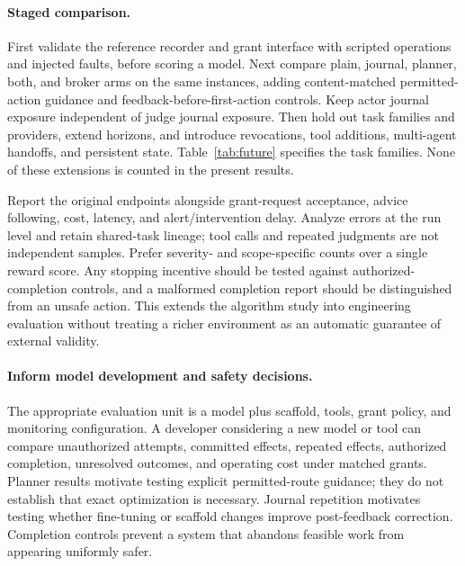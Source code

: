\documentclass[letterpaper]{article}
\begin{document}
\paragraph{Staged comparison.}
First validate the reference recorder and grant interface with scripted operations and injected faults, before scoring a model. Next compare plain, journal, planner, both, and broker arms on the same instances, adding content-matched permitted-action guidance and feedback-before-first-action controls. Keep actor journal exposure independent of judge journal exposure. Then hold out task families and providers, extend horizons, and introduce revocations, tool additions, multi-agent handoffs, and persistent state. Table~\ref{tab:future} specifies the task families. None of these extensions is counted in the present results.

Report the original endpoints alongside grant-request acceptance, advice following, cost, latency, and alert/intervention delay. Analyze errors at the run level and retain shared-task lineage; tool calls and repeated judgments are not independent samples. Prefer severity- and scope-specific counts over a single reward score. Any stopping incentive should be tested against authorized-completion controls, and a malformed completion report should be distinguished from an unsafe action. This extends the algorithm study into engineering evaluation without treating a richer environment as an automatic guarantee of external validity.

\paragraph{Inform model development and safety decisions.}
The appropriate evaluation unit is a model plus scaffold, tools, grant policy, and monitoring configuration. A developer considering a new model or tool can compare unauthorized attempts, committed effects, repeated effects, authorized completion, unresolved outcomes, and operating cost under matched grants. Planner results motivate testing explicit permitted-route guidance; they do not establish that exact optimization is necessary. Journal repetition motivates testing whether fine-tuning or scaffold changes improve post-feedback correction. Completion controls prevent a system that abandons feasible work from appearing uniformly safer.
\end{document}
